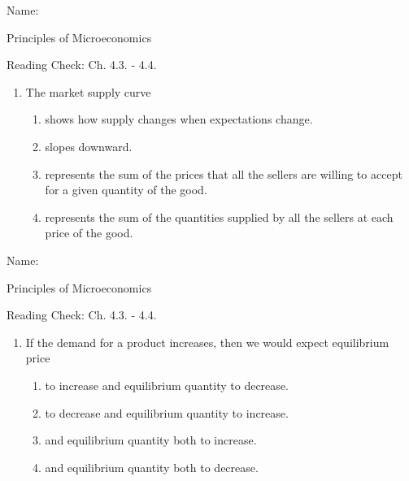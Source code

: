 \documentclass{article}
\begin{document}
\bigskip

Name: \underline{\phantom{xxxxxxxxxxxxxxxxxxxx}}

Principles of Microeconomics

Reading Check: Ch. 4.3. - 4.4.

\begin{enumerate}

\item The market supply curve

	\begin{enumerate}
	
	\item shows how supply changes when expectations change.
	
	\item slopes downward.
	
	\item represents the sum of the prices that all the sellers are willing to accept for a given quantity of the good.
	
	\item represents the sum of the quantities supplied by all the sellers at each price of the good. 
	
	\end{enumerate}

\end{enumerate}

\bigskip

Name: \underline{\phantom{xxxxxxxxxxxxxxxxxxxx}}

Principles of Microeconomics

Reading Check: Ch. 4.3. - 4.4.

\begin{enumerate}

\item If the demand for a product increases, then we would expect equilibrium price

	\begin{enumerate}
	
	\item to increase and equilibrium quantity to decrease.
	
	\item to decrease and equilibrium quantity to increase.
	
	\item and equilibrium quantity both to increase.
	
	\item and equilibrium quantity both to decrease.
	
	\end{enumerate}

\end{enumerate}
\end{document}
